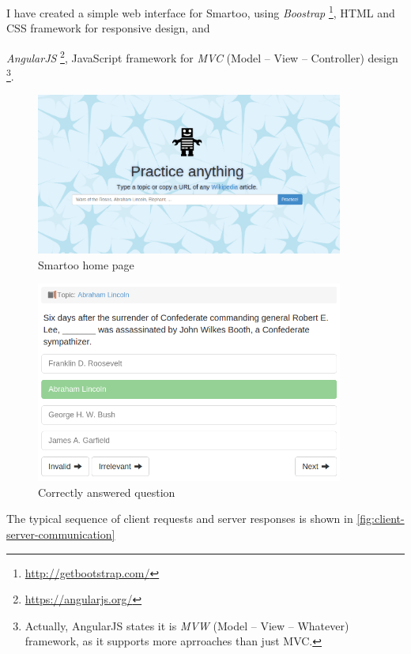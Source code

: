 \documentclass[a4paper, 12pt, twoside]{fithesis2}		%
\renewcommand{\_}{\leavevmode \kern0.07em\vbox{\hrule width0.4em}}
\begin{document}
I have created a simple web interface for Smartoo,
using \textit{Boostrap}%
\footnote{\url{http://getbootstrap.com/}},
HTML and CSS framework for responsive design,
and {\textit{AngularJS}%
\footnote{\url{https://angularjs.org/}},
JavaScript framework for \textit{MVC} (Model -- View -- Controller) design%
\footnote{Actually, AngularJS states it is \textit{MVW} (Model -- View -- Whatever) framework, as it supports more aprroaches than just MVC.}.

\begin{figure}[h]
  \centering
  \includegraphics[width=0.9\textwidth]{images/home-page.png}
  \caption{Smartoo home page}
  \label{fig:smartoo-home}
\end{figure}

\begin{figure}[h]
  \centering
  \includegraphics[width=0.9\textwidth]{images/answered-correctly.png}
  \caption{Correctly answered question}
  \label{fig:correctly-answered-question}
\end{figure}

The typical sequence of client requests and server responses is shown in
\autoref{fig:client-server-communication}

}
\end{document}
